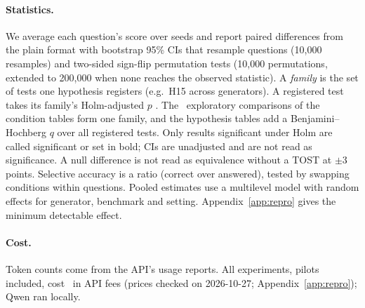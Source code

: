 \paragraph{Statistics.}
We average each question's score over seeds and report paired differences from the plain format with
bootstrap 95\% CIs that resample questions (10,000 resamples) and two-sided sign-flip permutation tests
\citep{efron1993bootstrap,dror2018hitchhiker} (10,000 permutations, extended to 200,000 when none reaches the observed
statistic). A \emph{family} is the set of tests one hypothesis registers (e.g.\ H15 across generators). A registered
test takes its family's Holm-adjusted $p$ \citep{holm1979simple}. The \nExploratory\ exploratory comparisons of the
condition tables form one family, and the hypothesis tables add a Benjamini--Hochberg $q$ over all registered tests.
Only results significant under Holm are called significant or set in bold; CIs are unadjusted and are not read as
significance. A null difference is not read
as equivalence without a TOST \citep{lakens2017equivalence} at $\pm$3 points. Selective accuracy is a ratio (correct
over answered), tested by swapping conditions within questions. Pooled estimates use a multilevel model with random
effects for generator, benchmark and setting. Appendix~\ref{app:repro} gives the minimum detectable effect.

\paragraph{Cost.}
Token counts come from the API's usage reports. All experiments, pilots included, cost \totalSpend\ in API fees
(prices checked on 2026-10-27; Appendix~\ref{app:repro}); Qwen ran locally.
